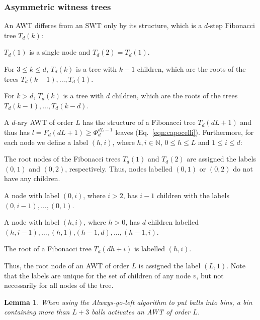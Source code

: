 \documentclass[a4paper,12pt]{article}
\newtheorem{lemma}{Lemma}
\begin{document}
\subsubsection{Asymmetric witness trees}
\label{sec:analysis:definitionAsymWT}
An AWT differes from an SWT only by its structure, which is a $d$-step Fibonacci tree $T_d\left(k \right)$:

\begin{compactitem}
\item $T_d(1)$ is a single node and  $T_d(2) = T_d(1)$.
\item For $3\leq k \leq d$, $T_d(k)$ is a tree with $k-1$ children, which are the roots of the trees $T_d(k-1),\ldots,T_d(1)$.
\item For $k>d$, $T_d(k)$ is a tree with $d$ children, which are the roots of the trees $T_d(k-1),\ldots,T_d(k-d)$.
\end{compactitem}
A $d$-ary AWT of order $L$ has the structure of a Fibonacci tree $T_d(d  L+1)$ and thus has $l=F_d(d L + 1) \geq \Phi_d^{d L-1}$ leaves (Eq.~\ref{eqn:capocelli}).
Furthermore, for each node we define a label $(h, i)$, where $h, i \in \mathbb{N}$, $0 \leq h \leq L$ and  $1\leq i \leq d$:
\begin{compactitem}
\item The root nodes of the Fibonacci trees $T_d(1)$ and $T_d(2)$ are assigned the labels $(0,1)$ and $(0,2)$, respectively. Thus, nodes labelled $(0,1)$ or $(0,2)$ do not have any children.
\item A node with label $(0, i)$, where $i>2$, has $i-1$ children with the labels $(0,i-1),\dots,(0,1)$.
\item A node with label $(h,i)$, where $h>0$, has $d$ children labelled $(h,i-1),\dots,(h,1)$,$(h-1,d),\dots,(h-1, i)$.
\item The root of a Fibonacci tree $T_d(d h+i)$ is labelled $(h, i)$. 
\end{compactitem}
Thus, the root node of an AWT of order $L$ is assigned the label $(L, 1)$. Note that the labels are unique for the set of children of any node $v$, but not necessarily for all nodes of the tree. 
\begin{lemma}
When using the Always-go-left algorithm to put balls into bins, a bin containing more than $L+3$ balls activates an AWT of order $L$.
\end{lemma}
\end{document}
